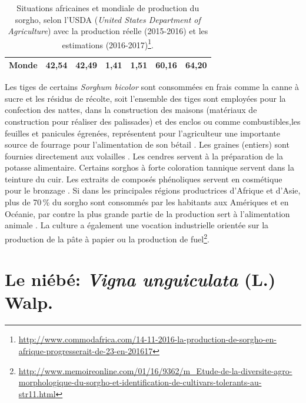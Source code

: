 \documentclass[a4paper,11pt]{article}
\begin{document}
\begin{table}
\begin{footnotesize}
\begin{center}
\begin{tabular}{ld{2.3}d{2.3}d{2.3}d{2.3}d{2.3}d{2.3}}
        \textbf{Monde} & 42,54  & 42,49 & 1,41 & 1,51 & 60,16 & 64,20 \\ \hline
      \end{tabular}
      \caption{Situations africaines et mondiale de production du
        sorgho, selon l'USDA (\emph{United States Department of
          Agriculture}) avec la production réelle (2015-2016) et les
        estimations
        (2016-2017)\protect\footnote{\protect\url{http://www.commodafrica.com/14-11-2016-la-production-de-sorgho-en-afrique-progresserait-de-23-en-201617}}.}
      \label{tab:USDA_global_sorgho_production}
    \end{center}
  \end{footnotesize}
\end{table}


Les tiges de certains \emph{Sorghum bicolor} sont consommées en frais
comme la canne à sucre et les résidus de récolte, soit l'ensemble des
tiges sont employées pour la confection des nattes, dans la
construction des maisons (matériaux de construction pour réaliser des
palissades) et des enclos ou comme combustibles,les feuilles et
panicules égrenées, représentent pour l'agriculteur une importante
source de fourrage pour l'alimentation de son bétail
\cite{Chantereau_1991}. Les graines (entiers) sont fournies
directement aux volailles \cite{SaintClair_1989}. Les cendres servent
à la préparation de la potasse alimentaire. Certains sorghos à forte
coloration tannique servent dans la teinture du cuir. Les extraits de
composés phénoliques servent en cosmétique pour le bronzage
\cite{BARRO_KONDOMBO_2010}. Si dans les principales régions
productrices d'Afrique et d'Asie, plus de 70\,\% du sorgho sont
consommés par les habitants aux Amériques et en Océanie, par contre la
plus grande partie de la production sert à l'alimentation animale
\cite{BARRO_KONDOMBO_2010}. La culture a également une vocation
industrielle orientée sur la production de la pâte à papier ou la
production de
fuel\footnote{\url{http://www.memoireonline.com/01/16/9362/m_Etude-de-la-diversite-agro-morphologique-du-sorgho-et-identification-de-cultivars-tolerants-au-str11.html}}.


\section{Le niébé: \emph{Vigna unguiculata} (L.) Walp.}
\end{document}
